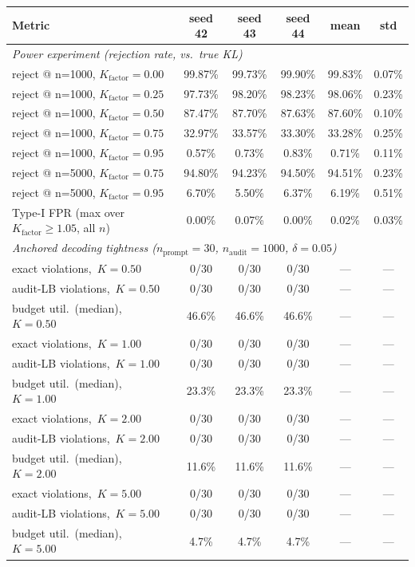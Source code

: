 \begin{tabular}{@{}lccccc@{}}
\toprule
\textbf{Metric} & \textbf{seed 42} & \textbf{seed 43} & \textbf{seed 44} & \textbf{mean} & \textbf{std} \\
\midrule
\multicolumn{6}{l}{\textit{Power experiment (rejection rate, vs.\ true KL)}} \\
\quad reject @ n=1000, $K_{\mathrm{factor}}=0.00$ & 99.87\% & 99.73\% & 99.90\% & 99.83\% & 0.07\% \\
\quad reject @ n=1000, $K_{\mathrm{factor}}=0.25$ & 97.73\% & 98.20\% & 98.23\% & 98.06\% & 0.23\% \\
\quad reject @ n=1000, $K_{\mathrm{factor}}=0.50$ & 87.47\% & 87.70\% & 87.63\% & 87.60\% & 0.10\% \\
\quad reject @ n=1000, $K_{\mathrm{factor}}=0.75$ & 32.97\% & 33.57\% & 33.30\% & 33.28\% & 0.25\% \\
\quad reject @ n=1000, $K_{\mathrm{factor}}=0.95$ & 0.57\% & 0.73\% & 0.83\% & 0.71\% & 0.11\% \\
\quad reject @ n=5000, $K_{\mathrm{factor}}=0.75$ & 94.80\% & 94.23\% & 94.50\% & 94.51\% & 0.23\% \\
\quad reject @ n=5000, $K_{\mathrm{factor}}=0.95$ & 6.70\% & 5.50\% & 6.37\% & 6.19\% & 0.51\% \\
\quad Type-I FPR (max over $K_{\mathrm{factor}}\!\ge\!1.05$, all $n$) & 0.00\% & 0.07\% & 0.00\% & 0.02\% & 0.03\% \\
\midrule
\multicolumn{6}{l}{\textit{Anchored decoding tightness ($n_{\mathrm{prompt}}=30$, $n_{\mathrm{audit}}=1000$, $\delta=0.05$)}} \\
\quad exact violations,\ $K=0.50$ & 0/30 & 0/30 & 0/30 & --- & --- \\
\quad audit-LB violations,\ $K=0.50$ & 0/30 & 0/30 & 0/30 & --- & --- \\
\quad budget util.\ (median),\ $K=0.50$ & 46.6\% & 46.6\% & 46.6\% & --- & --- \\
\quad exact violations,\ $K=1.00$ & 0/30 & 0/30 & 0/30 & --- & --- \\
\quad audit-LB violations,\ $K=1.00$ & 0/30 & 0/30 & 0/30 & --- & --- \\
\quad budget util.\ (median),\ $K=1.00$ & 23.3\% & 23.3\% & 23.3\% & --- & --- \\
\quad exact violations,\ $K=2.00$ & 0/30 & 0/30 & 0/30 & --- & --- \\
\quad audit-LB violations,\ $K=2.00$ & 0/30 & 0/30 & 0/30 & --- & --- \\
\quad budget util.\ (median),\ $K=2.00$ & 11.6\% & 11.6\% & 11.6\% & --- & --- \\
\quad exact violations,\ $K=5.00$ & 0/30 & 0/30 & 0/30 & --- & --- \\
\quad audit-LB violations,\ $K=5.00$ & 0/30 & 0/30 & 0/30 & --- & --- \\
\quad budget util.\ (median),\ $K=5.00$ & 4.7\% & 4.7\% & 4.7\% & --- & --- \\
\bottomrule
\end{tabular}
